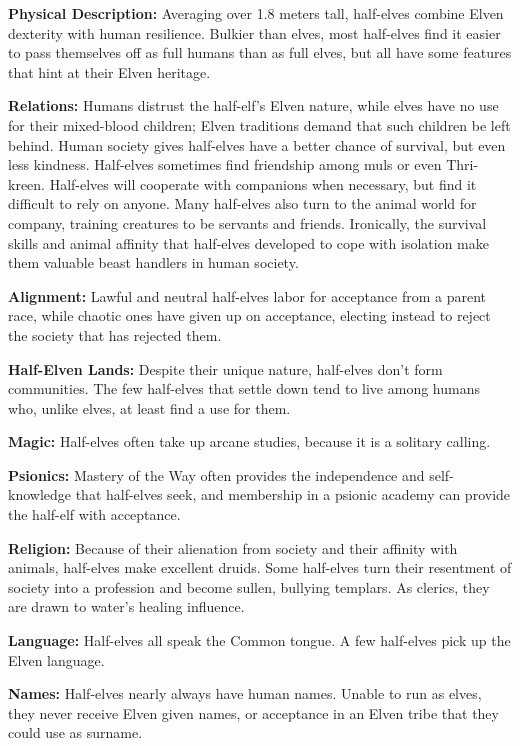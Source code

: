 \textbf{Physical Description:} Averaging over 1.8 meters tall, half-elves combine Elven dexterity with human resilience. Bulkier than elves, most half-elves find it easier to pass themselves off as full humans than as full elves, but all have some features that hint at their Elven heritage.

\textbf{Relations:} Humans distrust the half-elf's Elven nature, while elves have no use for their mixed-blood children; Elven traditions demand that such children be left behind. Human society gives half-elves have a better chance of survival, but even less kindness. Half-elves sometimes find friendship among muls or even Thri-kreen. Half-elves will cooperate with companions when necessary, but find it difficult to rely on anyone. Many half-elves also turn to the animal world for company, training creatures to be servants and friends. Ironically, the survival skills and animal affinity that half-elves developed to cope with isolation make them valuable beast handlers in human society.

\textbf{Alignment:} Lawful and neutral half-elves labor for acceptance from a parent race, while chaotic ones have given up on acceptance, electing instead to reject the society that has rejected them.

\textbf{Half-Elven Lands:} Despite their unique nature, half-elves don't form communities. The few half-elves that settle down tend to live among humans who, unlike elves, at least find a use for them.

\textbf{Magic:} Half-elves often take up arcane studies, because it is a solitary calling.

\textbf{Psionics:} Mastery of the Way often provides the independence and self-knowledge that half-elves seek, and membership in a psionic academy can provide the half-elf with acceptance.

\textbf{Religion:} Because of their alienation from society and their affinity with animals, half-elves make excellent druids. Some half-elves turn their resentment of society into a profession and become sullen, bullying templars. As clerics, they are drawn to water's healing influence.

\textbf{Language:} Half-elves all speak the Common tongue. A few half-elves pick up the Elven language.

\textbf{Names:} Half-elves nearly always have human names. Unable to run as elves, they never receive Elven given names, or acceptance in an Elven tribe that they could use as surname.

